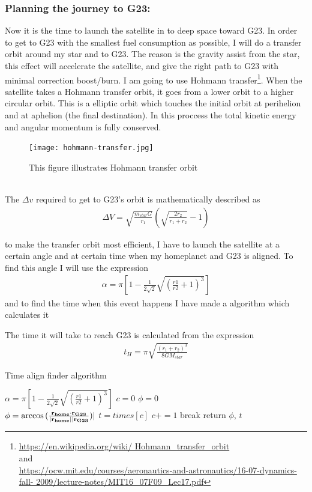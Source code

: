\documentclass[a4paper,11pt,english]{report}
\begin{document}
\subsubsection{Planning the journey to G23:} Now it is the time to launch the satellite
in to deep space toward G23. In order to get to G23 with the 
smallest fuel consumption as possible, I will do a transfer orbit around my
star and to G23.
The reason is the gravity assist from the star, this effect will accelerate the
satellite, and give the right path to G23 with minimal correction boost/burn. I am
going to  use Hohmann transfer\footnote{\url{https://en.wikipedia.org/wiki/
    Hohmann_transfer_orbit}\\
  and\\
  \url{https://ocw.mit.edu/courses/aeronautics-and-astronautics/16-07-dynamics-fall-
    2009/lecture-notes/MIT16_07F09_Lec17.pdf}}.  When the satellite takes a
Hohmann transfer orbit, it goes from a lower orbit to a higher circular orbit.
This is a elliptic orbit which touches the initial orbit at perihelion and at
aphelion (the final destination). In this proccess the total kinetic energy and
angular momentum is fully conserved.
\begin{figure}[h]
  \centering
  \texttt{[image: hohmann-transfer.jpg]}
  \caption{This figure illustrates Hohmann transfer orbit}
\end{figure}
\\
  The \(\Delta v\) required  to get to G23's orbit is
  mathematically described as
  \begin{align}
    \Delta V = \sqrt{\frac{m_{star}G}{r_{1}}}(\sqrt{\frac{2r_{2}}{r_{1} + r_{2}}} - 1)
  \end{align}


to make the transfer orbit most efficient, I have to launch the satellite at a
certain angle and at certain time when my homeplanet and G23 is aligned. To
find this angle I will use the expression
\begin{align}
  \alpha = \pi[1 - \frac{1}{2\sqrt{2}}\sqrt{(\frac{r1}{r2} + 1)^{3}} ]
\end{align}
and to find the time when this event happens I have made a
algorithm which calculates it

 The time it will take to reach G23 is calculated from the expression
\begin{align}
  t_{H} = \pi \sqrt{\frac{(r_{1} + r_{2})^{3}}{8GM_{star}}}
\end{align}

\begin{algorithm}
  \caption{Time align finder algorithm}
  \label{CHalgorithm}
  \begin{algorithmic}[1]
    \State \(\alpha =\pi[1 - \frac{1}{2\sqrt{2}}\sqrt{(\frac{r1}{r2} + 1)^{3}} ] \)
    \State \(c = 0\)
    \State \(\phi = 0\)
    \\
    \State \(\phi = \arccos{(\frac{\bold{r_{home}}\cdot\bold{r_{G23}}}{|\bold{r_{home}}|
        |\bold{r_{G23}}})}|\)
    \State \(t = times[c]\)
    \State \(c += 1\)
    \If{ \(\phi \le \alpha\):}
  \State break
  \EndIf
  \EndWhile
  \State return \(\phi\), \(t\)
  \end{algorithmic}
\end{algorithm}
\end{document}
